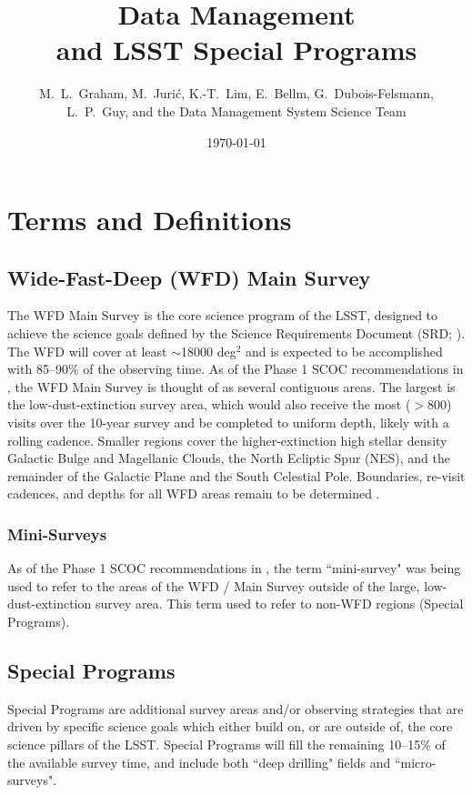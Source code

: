 \documentclass[DM,lsstdoc,toc]{lsstdoc}
\title[LSST Special Programs]{Data Management \\ and LSST Special Programs}
\author{M.~L.~Graham, M.~Juri\'{c}, K.-T.~Lim, E.~Bellm, G.~Dubois-Felsmann, L.~P.~Guy, and the Data Management System Science Team}
\date{\today}
\begin{document}
\maketitle


\section{Terms and Definitions} \label{sec:terms}

\subsection{Wide-Fast-Deep (WFD) Main Survey}\label{ssec:terms_wfd}
The WFD Main Survey is the core science program of the LSST, designed to achieve the science goals defined by the Science Requirements Document (SRD; ).
The WFD will cover at least $\sim$18000 deg$^2$ and is expected to be accomplished with 85--90\% of the observing time.
As of the Phase 1 SCOC recommendations in , the WFD Main Survey is thought of as several contiguous areas.
The largest is the low-dust-extinction survey area, which would also receive the most ($>$800) visits over the 10-year survey and be completed to uniform depth, likely with a rolling cadence.
Smaller regions cover the higher-extinction high stellar density Galactic Bulge and Magellanic Clouds, the North Ecliptic Spur (NES), and the remainder of the Galactic Plane and the South Celestial Pole.
Boundaries, re-visit cadences, and depths for all WFD areas remain to be determined .

\subsubsection{Mini-Surveys}\label{sssec:terms_wfd_mini}
As of the Phase 1 SCOC recommendations in , the term ``mini-survey" was being used to refer to the areas of the WFD / Main Survey outside of the large, low-dust-extinction survey area.
This term used to refer to non-WFD regions (Special Programs).

\subsection{Special Programs}\label{ssec:terms_sp}
Special Programs are additional survey areas and/or observing strategies that are driven by specific science goals which either build on, or are outside of, the core science pillars of the LSST.
Special Programs will fill the remaining 10--15\% of the available survey time, and include both ``deep drilling" fields and ``micro-surveys".
\end{document}
